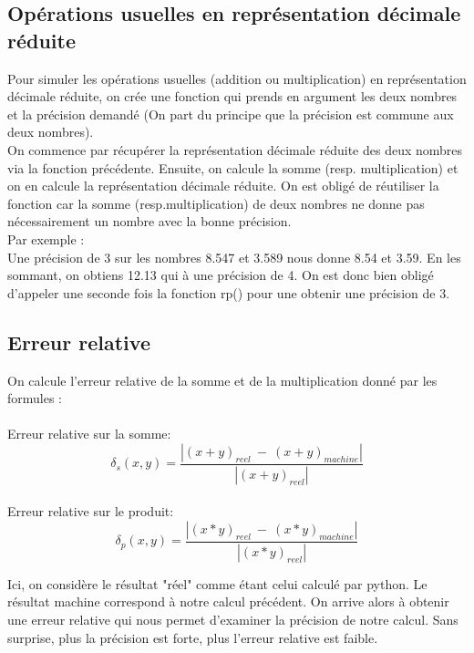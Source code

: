 \documentclass{article}
\begin{document}
\subsection*{Opérations usuelles en représentation décimale réduite}

Pour simuler les opérations usuelles (addition ou multiplication) en représentation décimale réduite, on crée une fonction qui prends en argument les deux nombres et la précision demandé (On part du principe que la précision est commune aux deux nombres). \\
On commence par récupérer la représentation décimale réduite des deux nombres via la fonction précédente. Ensuite, on calcule la somme (resp. multiplication) et on en calcule la représentation décimale réduite. On est obligé de réutiliser la fonction car la somme (resp.multiplication) de deux nombres ne donne pas nécessairement un nombre avec la bonne précision. \\
\newline
Par exemple : \\
Une précision de 3 sur les nombres 8.547 et 3.589 nous donne 8.54 et 3.59. En les sommant, on obtiens 12.13 qui à une précision de 4. On est donc bien obligé d'appeler une seconde fois la fonction rp() pour une obtenir une précision de 3.

\subsection*{Erreur relative}

On calcule l'erreur relative de la somme et de la multiplication donné par les formules : \\
\\
Erreur relative sur la somme:
\begin{equation}
\delta_{s}(x,y) = \frac{ \left |  (x+y)_{reel}\ - \ (x+y)_{machine} \right | }{\left |  (x+y)_{reel} \right | }
\end{equation}
\\
Erreur relative sur le produit:
\begin{equation}
\delta_{p}(x,y) = \frac{ \left |  (x*y)_{reel}\ - \ (x*y)_{machine} \right | }{\left |  (x*y)_{reel} \right | }
\end{equation}


Ici, on considère le résultat "réel" comme étant celui calculé par python. Le résultat machine correspond à notre calcul précédent. On arrive alors à obtenir une erreur relative qui nous permet d'examiner la précision de notre calcul. 
Sans surprise, plus la précision est forte, plus l'erreur relative est faible.
\end{document}

